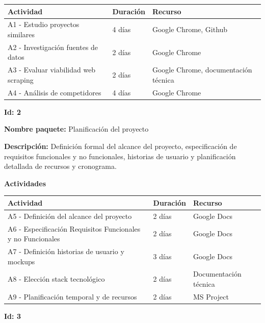 \begin{center}
\small
\begin{tabular}{|p{}|p{}|p{}|}
\hline
\textbf{Actividad} & \textbf{Duración} & \textbf{Recurso} \\
\hline
A1 - Estudio proyectos similares & 4 días & Google Chrome, Github \\
\hline
A2 - Investigación fuentes de datos & 2 días & Google Chrome \\
\hline
A3 - Evaluar viabilidad web scraping & 2 días & Google Chrome, documentación técnica \\
\hline
A4 - Análisis de competidores & 4 días & Google Chrome \\
\hline
\end{tabular}
\end{center}

\vspace{0.5cm}

\textbf{Id: 2}

\textbf{Nombre paquete:} Planificación del proyecto

\textbf{Descripción:} Definición formal del alcance del proyecto, especificación de requisitos funcionales y no funcionales, historias de usuario y planificación detallada de recursos y cronograma.

\textbf{Actividades}

\begin{center}
\small
\begin{tabular}{|p{}|p{}|p{}|}
\hline
\textbf{Actividad} & \textbf{Duración} & \textbf{Recurso} \\
\hline
A5 - Definición del alcance del proyecto & 2 días & Google Docs \\
\hline
A6 - Especificación Requisitos Funcionales y no Funcionales & 2 días & Google Docs \\
\hline
A7 - Definición historias de usuario y mockups & 3 días & Google Docs \\
\hline
A8 - Elección stack tecnológico & 2 días & Documentación técnica \\
\hline
A9 - Planificación temporal y de recursos & 2 días & MS Project \\
\hline
\end{tabular}
\end{center}

\vspace{0.5cm}

\textbf{Id: 3}

